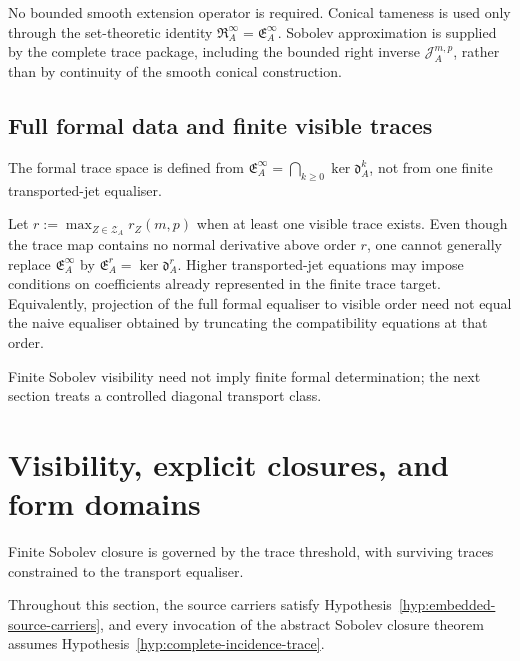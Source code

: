 \documentclass[11pt]{article}
\theoremstyle{plain}
\theoremstyle{definition}
\begin{document}
No bounded smooth extension operator is required. Conical tameness is
used only through the set-theoretic identity
\(\mathfrak R_A^\infty = \mathfrak E_A^\infty\).
Sobolev approximation is supplied by the complete trace package,
including the bounded right inverse
\(\mathcal J_A^{m,p}\),
rather than by continuity of the smooth conical construction.

\subsection{Full formal data and finite visible traces}
\label{subsec:full-formal-visible-traces}

The formal trace space is defined from
\(\mathfrak E_A^\infty = \bigcap_{k\geq0} \ker\mathfrak d_A^k\),
not from one finite transported-jet equaliser.

Let \(r := \max_{Z\in\mathscr Z_A} r_Z(m,p)\) when at least one visible trace exists. Even though the trace map
contains no normal derivative above order \(r\), one cannot generally
replace \(\mathfrak E_A^\infty\) by
\(\mathfrak E_A^r = \ker\mathfrak d_A^r\).
Higher transported-jet equations may impose conditions on coefficients
already represented in the finite trace target. Equivalently,
projection of the full formal equaliser to visible order need not equal
the naive equaliser obtained by truncating the compatibility equations
at that order.

Finite Sobolev visibility need not imply finite formal determination; the next section treats a controlled diagonal transport class.

\section{Visibility, explicit closures, and form domains}
\label{sec:visibility}

Finite Sobolev closure is governed by the trace threshold, with surviving traces constrained to the transport equaliser.

Throughout this section, the source carriers satisfy
Hypothesis~\ref{hyp:embedded-source-carriers}, and every invocation of
the abstract Sobolev closure theorem assumes
Hypothesis~\ref{hyp:complete-incidence-trace}.
\end{document}
